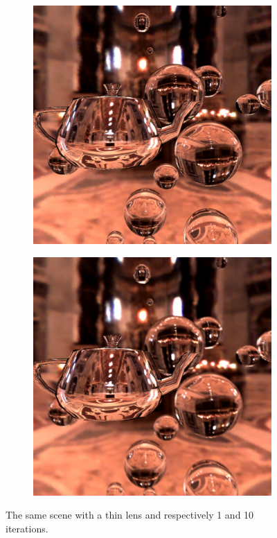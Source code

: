 \documentclass[acmsmall]{acmart}
\begin{document}
\begin{figure}[h]
    \centering
    
\begin{subfigure}{.5\textwidth}
  \centering
  \includegraphics[width=.9\linewidth]{img/lens1.png}
\end{subfigure}%
\begin{subfigure}{.5\textwidth}
  \centering
  \includegraphics[width=.9\linewidth]{img/lens10.png}
\end{subfigure} 
    
    
    \caption{The same scene with a thin lens and respectively 1 and 10 iterations. }
    \label{fig:lens}
\end{figure}
\end{document}
